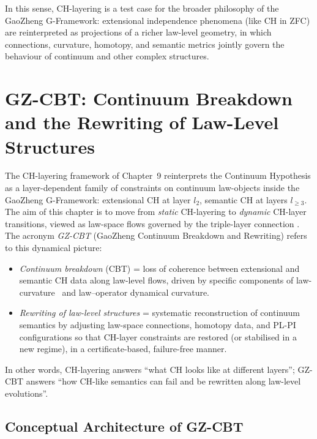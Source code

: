\documentclass[11pt]{book}
\theoremstyle{plain}
\theoremstyle{definition}
\begin{document}
In this sense, CH-layering is a test case for the broader philosophy of
the GaoZheng G-Framework: extensional independence phenomena (like CH in
ZFC) are reinterpreted as projections of a richer law-level geometry,
in which connections, curvature, homotopy, and semantic metrics jointly
govern the behaviour of continuum and other complex structures.



\chapter[GZ-CBT: Continuum Breakdown]{GZ-CBT: Continuum Breakdown and the Rewriting of Law-Level Structures}


The CH-layering framework of Chapter~9 reinterprets the Continuum
Hypothesis as a layer-dependent family of constraints on continuum
law-objects inside the GaoZheng G-Framework: extensional CH at layer
$l_2$, semantic CH at layers $l_{\ge3}$. The aim of this chapter is to
move from \emph{static} CH-layering to \emph{dynamic} CH-layer
transitions, viewed as law-space flows governed by the triple-layer
connection \GZTLC. The acronym \emph{GZ-CBT} (GaoZheng Continuum
Breakdown and Rewriting) refers to this dynamical picture:

\begin{itemize}
  \item \emph{Continuum breakdown} (CBT) = loss of coherence between
        extensional and semantic CH data along law-level flows, driven
        by specific components of law-curvature \GZLCurv\ and
        law--operator dynamical curvature.
  \item \emph{Rewriting of law-level structures} = systematic
        reconstruction of continuum semantics by adjusting law-space
        connections, homotopy data, and PL-PI configurations so that
        CH-layer constraints are restored (or stabilised in a new
        regime), in a certificate-based, failure-free manner.
\end{itemize}

In other words, CH-layering answers “what CH looks like at different
layers”; GZ-CBT answers “how CH-like semantics can fail and be
rewritten along law-level evolutions”.



\section{Conceptual Architecture of GZ-CBT}
\end{document}

